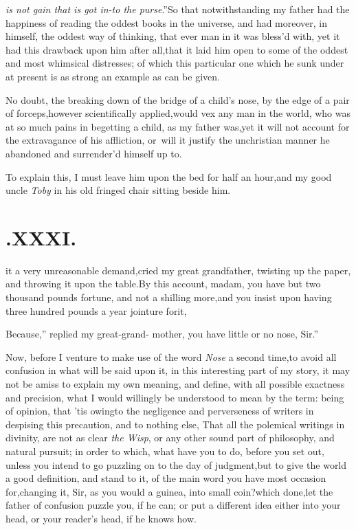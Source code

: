 \documentclass{article}
\begin{document}
\textit{is not
gain that is got in-\break to the purse}.”\tsk So that\break
notwithstanding my father had the happiness of reading the
oddest books in the universe, and had moreover, in himself, the
oddest way of thinking, that ever man in it was bless’d with, yet
it had this drawback upon him after all,\tsh that it laid him
open to some of the oddest and most whimsical distresses; of
which this particular one which he sunk under at present is as
strong an example as can be given.

No doubt, the breaking down of the bridge of a child’s
nose, by the edge of a pair of forceps,\tsk however scientifically
applied,\tsk would vex any man in the world, who was at so much
pains in begetting a child, as my father was,\tsk yet it will not
account for the extravagance of his affliction, or\sic\ will it justify
the unchristian manner he abandoned and surrender’d himself up
to.

To explain this, I must leave him upon the bed for half an
hour,\tsh and my good uncle \textit{Toby} in his old fringed
chair sitting beside him.

\null
\section{.\quad  XXXI.}

 it a very unreason\-able
demand,\tsk cried my great\break
grandfather, twisting up the paper,
and throwing it upon the table.\tsh By this account, madam, you
have but two thou\-sand pounds fortune, and not a shilling
more,\tsh and you insist upon having three hundred pounds a year
jointure for\break it,\tsk

\tsk \lqq Because,” replied my great-grand-\break
mother, \lqq you have little or no nose,\break
\lqq Sir.”\tsh

Now, before I venture to make use
of the word \textit{Nose} a
second time,\tsk to avoid all confusion in what will be said upon
it, in this interesting part of my story, it may not be amiss to
explain my own meaning, and define, with all possible exactness and
precision, what I would willingly be understood to mean by the
term: being of opinion, that ’tis owing\break to the negligence and
perverseness of writers in despising this precaution, and to
nothing else,\tsh
That all the polemi\-cal writings in divinity, are not as clear
\textit{the Wisp}, or any
other sound part of phi\-losophy, and natural pursuit; in order to
which, what have you to do, before you set out, unless you
intend to go puzzling on to the day of judgment,\tsh but
to\break
give the world a good definition, and stand to it, of the main
word you have most occasion for,\tsh changing it, Sir, as
you would a guinea, into small coin?\tsk which done,\tsk let the
father of confusion puzzle you, if he can; or put a different
idea either into your head, or your reader’s head, if he knows
how.
\end{document}
